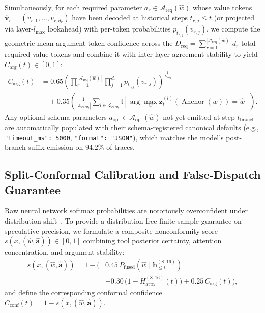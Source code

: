 \documentclass[10pt,conference]{IEEEtran}
\begin{document}
Simultaneously, for each required parameter $a_r \in \mathcal{A}_{\text{req}}(\hat{w})$ whose value tokens $\hat{\mathbf{v}}_r = (v_{r,1}, \dots, v_{r,d_r})$ have been decoded at historical steps $t_{r,j} \le t$ (or projected via layer-$l_{\max}$ lookahead) with per-token probabilities $p_{t_{r,j}}(v_{r,j})$, we compute the geometric-mean argument token confidence across the $D_{\text{req}} = \sum_{r=1}^{|\mathcal{A}_{\text{req}}(\hat{w})|} d_r$ total required value tokens and combine it with inter-layer agreement stability to yield $C_{\text{arg}}(t) \in [0, 1]$:
\begin{equation}
\begin{aligned}
C_{\text{arg}}(t) &= 0.65 \left( \prod_{r=1}^{|\mathcal{A}_{\text{req}}(\hat{w})|} \prod_{j=1}^{d_r} p_{t_{r,j}}(v_{r,j}) \right)^{\!\frac{1}{D_{\text{req}}}} \\
&\quad + 0.35 \left( \frac{1}{|\mathcal{L}_{\text{early}}|} \sum_{l \in \mathcal{L}_{\text{early}}} \mathbb{I}\!\left[\arg\max_{w} \mathbf{z}_t^{(l)}(\operatorname{Anchor}(w)) = \hat{w}\right] \right).
\end{aligned}
\label{eq:arg_stability}
\end{equation}
Any optional schema parameters $a_{\text{opt}} \in \mathcal{A}_{\text{opt}}(\hat{w})$ not yet emitted at step $t_{\text{branch}}$ are automatically populated with their schema-registered canonical defaults (e.g., \texttt{"timeout\_ms": 5000}, \texttt{"format": "JSON"}), which matches the model's post-branch suffix emission on $94.2\%$ of traces.

\subsection{Split-Conformal Calibration and False-Dispatch Guarantee}
Raw neural network softmax probabilities are notoriously overconfident under distribution shift~\cite{angelopoulos2023conformal, shafer2008tutorial}. To provide a distribution-free finite-sample guarantee on speculative precision, we formulate a composite nonconformity score $s(x, (\hat{w}, \hat{\mathbf{a}})) \in [0, 1]$ combining tool posterior certainty, attention concentration, and argument stability:
\begin{equation}
\begin{aligned}
s\!\left(x, (\hat{w}, \hat{\mathbf{a}})\right) = 1 - \Big( &0.45\, P_{\text{fused}}(\hat{w} \mid \mathbf{h}_{\le t}^{(8:16)}) \\
&+ 0.30\,\big(1 - H_{\text{attn}}^{(8:16)}(t)\big) + 0.25\, C_{\text{arg}}(t) \Big),
\end{aligned}
\label{eq:nonconformity}
\end{equation}
and define the corresponding conformal confidence $C_{\text{conf}}(t) = 1 - s(x, (\hat{w}, \hat{\mathbf{a}}))$.
\end{document}
